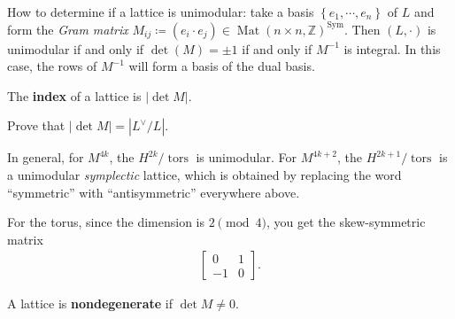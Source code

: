\begin{remark}

How to determine if a lattice is unimodular: take a basis
\(\left\{{ e_1, \cdots, e_n }\right\}\) of \(L\) and form the \emph{Gram
matrix}
\(M_{ij} \coloneqq( e_i \cdot e_j) \in \operatorname{Mat}(n\times n, {\mathbb{Z}})^{\operatorname{Sym}}\).
Then \((L, \cdot)\) is unimodular if and only if \(\det(M) = \pm 1\) if
and only if \(M ^{-1}\) is integral. In this case, the rows of
\(M ^{-1}\) will form a basis of the dual basis.

\end{remark}

\begin{definition}[?]

The \textbf{index} of a lattice is
\({\left\lvert { \det M} \right\rvert}\).

\end{definition}

\begin{exercise}[?]

Prove that
\({\left\lvert {\det M} \right\rvert} = {\left\lvert { L^\vee/ L } \right\rvert}\).

\end{exercise}

\begin{remark}

In general, for \(M^{4k}\), the \(H^{2k}/{\operatorname{tors}}\) is
unimodular. For \(M^{4k+2}\), the \(H^{2k+1}/{\operatorname{tors}}\) is
a unimodular \emph{symplectic} lattice, which is obtained by replacing
the word ``symmetric'' with ``antisymmetric'' everywhere above.

\end{remark}

\begin{example}[?]

For the torus, since the dimension is \(2 \pmod 4\), you get the
skew-symmetric matrix
\begin{align*}
\begin{bmatrix}
0  & 1
\\
-1 & 0
\end{bmatrix}
.\end{align*}


\end{example}

\begin{definition}[?]

A lattice is \textbf{nondegenerate} if \(\det M \neq 0\).

\end{definition}

